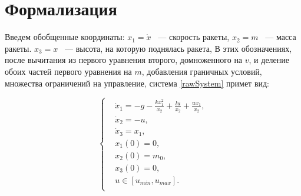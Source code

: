 \documentclass[10pt,pdf,hyperref={unicode}]{beamer}
\begin{document}
	\newpage
	
	\section{Формализация}
	Введем обобщенные координаты: 
	\(x_1 = \dot x\) ~--- скорость ракеты,
	\(x_2 = m\) ~--- масса ракеты.
	\(x_3 = x\) ~--- высота, на которую поднялась ракета, 
	В этих обозначениях, после вычитания из первого уравнения второго, домноженного на $v$, 
	и деление обоих частей первого уравнения на $m$, 
	добавления граничных условий, множества ограничений на управление, система \eqref{rawSystem} примет вид:
	
	\begin{equation}\label{mainSystem}
	\left\{
		\begin{aligned}
		&\dot x_1 = -g - \frac{k x_1^2}{x_2} + \frac{lu}{x_2} + \frac{u x_1}{x_2},\\
		&\dot x_2 = -u,\\
		&\dot x_3 = x_1, \\
		&x_1(0) = 0, \\
		&x_2(0) = m_0,\\
		&x_3(0) = 0,\\
		&u \in [u_{min}, u_{max}].\\
		\end{aligned}
	\right.
	\end{equation}
	
	
	
\end{document}
